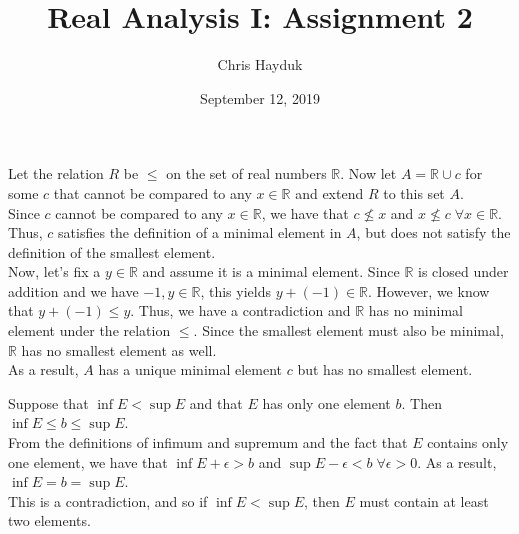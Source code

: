 \documentclass[12pt]{article}
\newenvironment{problem}[2][Problem]{\begin{trivlist}
\item[\hskip \labelsep {\bfseries #1}\hskip \labelsep {\bfseries #2.}]}{\end{trivlist}}
\begin{document}
\title{Real Analysis I: Assignment 2}

\author{Chris Hayduk}
\date{September 12, 2019}

\maketitle

\begin{problem}{1}
\end{problem}

Let the relation $R$ be $\leq$ on the set of real numbers $\mathbb{R}$. Now let $A = \mathbb{R} \cup c$ for some $c$ that cannot be compared to any $x \in \mathbb{R}$ and extend $R$ to this set $A$.\\

Since $c$ cannot be compared to any $x \in \mathbb{R}$, we have that $c \nleq x$ and $x \nleq c \; \forall x \in \mathbb{R}$. Thus, $c$ satisfies the definition of a minimal element in $A$, but does not satisfy the definition of the smallest element.\\

Now, let's fix a $y \in \mathbb{R}$ and assume it is a minimal element. Since $\mathbb{R}$ is closed under addition and we have $-1, y \in \mathbb{R}$, this yields $y + (-1) \in \mathbb{R}$. However, we know that $y + (-1) \leq y$. Thus, we have a contradiction and $\mathbb{R}$ has no minimal element under the relation $\leq$. Since the smallest element must also be minimal, $\mathbb{R}$ has no smallest element as well.\\

As a result, $A$ has a unique minimal element $c$ but has no smallest element.

\begin{problem}{2}
\end{problem}

Suppose that $\inf E < \sup E$ and that $E$ has only one element $b$. Then $\inf E \leq b \leq \sup E$.\\

From the definitions of infimum and supremum and the fact that $E$ contains only one element, we have that $\inf E + \epsilon > b$ and $\sup E - \epsilon < b \; \forall \epsilon > 0$. As a result, $\inf E = b = \sup E$.\\

This is a contradiction, and so if $\inf E < \sup E$, then $E$ must contain at least two elements.\\
\end{document}
